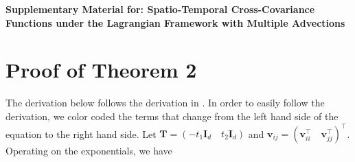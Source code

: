 \documentclass[12pt]{article}
\newcommand{\0}{\mathbf{0}}
\begin{document}
\thispagestyle{empty} \baselineskip=28pt \vskip 5mm
\begin{center} {\Large{\bf Supplementary Material for: Spatio-Temporal Cross-Covariance Functions under the Lagrangian Framework with Multiple Advections}}
	
\end{center}

\baselineskip=12pt \vskip 10mm

\baselineskip=26pt








\section{Proof of Theorem 2}

The derivation below follows the derivation in \cite{schlather2010some}. In order to easily follow the derivation, we color coded the terms that change from the left hand side of the equation to the right hand side. Let $\mathbf{T} = (-t_1 \mathbf{I}_d \quad t_2 \mathbf{I}_d )$ and $\mathbf{v}_{ij} = (\mathbf{v}_{ii}^{\top} \quad \mathbf{v}_{jj}^{\top})^{\top}$. Operating on the exponentials, we have

\begingroup
\allowdisplaybreaks

 \fontsize{8pt}{10pt}\selectfont 
\end{document}

